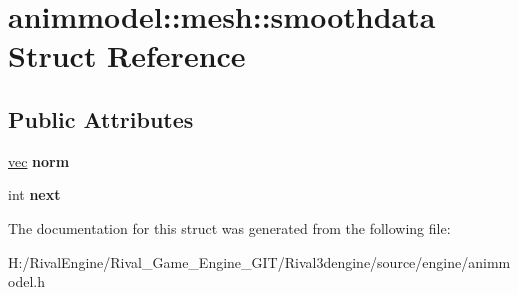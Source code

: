 \hypertarget{structanimmodel_1_1mesh_1_1smoothdata}{}\section{animmodel\+:\+:mesh\+:\+:smoothdata Struct Reference}
\label{structanimmodel_1_1mesh_1_1smoothdata}
\subsection*{Public Attributes}
\begin{DoxyCompactItemize}
\item 
\mbox{\label{structanimmodel_1_1mesh_1_1smoothdata_a53c23d1352f456bd7d094c476b4d986f}} 
\hyperlink{structvec}{vec} {\bfseries norm}
\item 
\mbox{\label{structanimmodel_1_1mesh_1_1smoothdata_af98f86e047c0b41ded0cd32e948a2ab4}} 
int {\bfseries next}
\end{DoxyCompactItemize}


The documentation for this struct was generated from the following file\+:\begin{DoxyCompactItemize}
\item 
H\+:/\+Rival\+Engine/\+Rival\+\_\+\+Game\+\_\+\+Engine\+\_\+\+G\+I\+T/\+Rival3dengine/source/engine/animmodel.\+h\end{DoxyCompactItemize}
